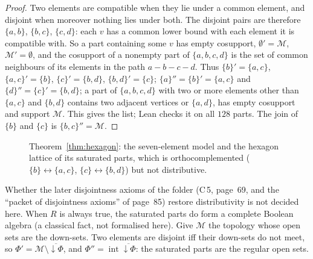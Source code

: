 \documentclass[11pt,a4paper]{amsart}
\theoremstyle{definition}
\theoremstyle{remark}
\newcommand{\cM}{\mathcal M}
\begin{document}
\begin{proof}
Two elements are compatible when they lie under a common element, and disjoint when moreover nothing lies under both. The disjoint pairs are therefore $\{a, b\}$, $\{b, c\}$, $\{c, d\}$: each $v$ has a common lower bound with each element it is compatible with. So a part containing some $v$ has empty cosupport, $\emptyset' = \cM$, $\cM' = \emptyset$, and the cosupport of a nonempty part of $\{a, b, c, d\}$ is the set of common neighbours of its elements in the path $a - b - c - d$. Thus $\{b\}' = \{a, c\}$, $\{a, c\}' = \{b\}$, $\{c\}' = \{b, d\}$, $\{b, d\}' = \{c\}$; $\{a\}'' = \{b\}' = \{a, c\}$ and $\{d\}'' = \{c\}' = \{b, d\}$; a part of $\{a, b, c, d\}$ with two or more elements other than $\{a, c\}$ and $\{b, d\}$ contains two adjacent vertices or $\{a, d\}$, has empty cosupport and support $\cM$. This gives the list; Lean checks it on all $128$ parts. The join of $\{b\}$ and $\{c\}$ is $\{b, c\}'' = \cM$.
\end{proof}

\begin{figure}[ht]
\centering
{}
\caption{Theorem~\ref{thm:hexagon}: the seven-element model and the hexagon lattice of its saturated parts, which is orthocomplemented ($\{b\} \leftrightarrow \{a,c\}$, $\{c\} \leftrightarrow \{b,d\}$) but not distributive.}\label{fig:hexagon}
\end{figure}

Whether the later disjointness axioms of the folder (C\,5, page~69, and the ``packet of disjointness axioms'' of page~85) restore distributivity is not decided here. When $R$ is always true, the saturated parts do form a complete Boolean algebra (a classical fact, not formalised here). Give $\cM$ the topology whose open sets are the down-sets. Two elements are disjoint iff their down-sets do not meet, so $\Phi' = \cM \setminus \overline{{\downarrow}\Phi}$, and $\Phi'' = \operatorname{int}\overline{{\downarrow}\Phi}$: the saturated parts are the regular open sets.
\end{document}
